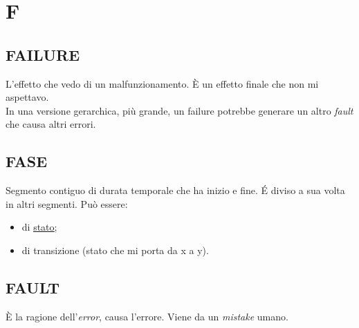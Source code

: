 \newpage
	\flushright{\hyperref[index]{\color{black!65}{Ritorna all'indice}}}\flushleft
	\section{F} \label{sec:F}
	
		\subsection{FAILURE}		\label{failure}	%
		L'effetto che vedo di un malfunzionamento. È un effetto finale che non mi aspettavo. \\
		In una versione gerarchica, più grande, un failure potrebbe generare un altro \textit{fault} che causa altri errori. %
	
		\subsection{FASE}  \label{fase}  
		Segmento contiguo di durata temporale che ha inizio e fine. É diviso a sua volta in altri segmenti. Può essere:
		\begin{itemize}
			\item di \underline{\hyperref[stato]{stato}};
			\item di transizione (stato che mi porta da x a y).
		\end{itemize}
	
		\subsection{FAULT}		\label{fault}
		È la ragione dell'\textit{error}, causa l'errore. Viene da un \textit{mistake} umano.
		
	
	
